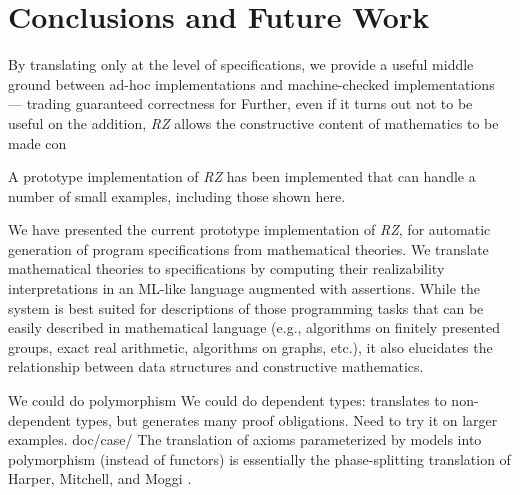 \section{Conclusions and Future Work}
\label{sec:conclusion}

By translating only at the level of specifications, we provide a
useful middle ground between ad-hoc implementations and machine-checked
implementations --- trading guaranteed correctness for 
Further, even if it turns out not to be useful on the 
addition, \emph{RZ} allows the constructive
content of mathematics to be made con

A prototype implementation of \emph{RZ} has been implemented that can
handle a number of small examples, including those shown here.



We have presented the current prototype implementation of 
\emph{RZ}, for automatic generation of
program specifications from mathematical theories. We translate
mathematical theories to specifications by computing their
realizability interpretations in an ML-like language augmented with
assertions. While the system is best suited for descriptions of those
programming tasks that can be easily described in mathematical
language (e.g., algorithms on finitely presented groups, exact real
arithmetic, algorithms on graphs, etc.), it also elucidates the
relationship between data structures and constructive mathematics.
 

We could do polymorphism
We could do dependent types: translates to non-dependent types, but generates many proof obligations.
Need to try it on larger examples.
doc/case/
  The translation of axioms
parameterized by models into polymorphism (instead of functors) is
essentially the phase-splitting translation of Harper, Mitchell, and
Moggi \cite{harper+:popl90}.


